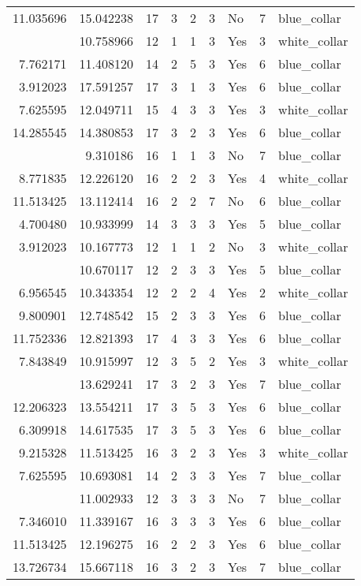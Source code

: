\documentclass[
]{article}
\begin{document}
\begin{longtable}[t]{rrrrrllrl}
11.035696 & 15.042238 & 17 & 3 & 2 & 3 & No & 7 & blue\_collar\\
\addlinespace
3.912023 & 10.758966 & 12 & 1 & 1 & 3 & Yes & 3 & white\_collar\\
7.762171 & 11.408120 & 14 & 2 & 5 & 3 & Yes & 6 & blue\_collar\\
3.912023 & 17.591257 & 17 & 3 & 1 & 3 & Yes & 6 & blue\_collar\\
7.625595 & 12.049711 & 15 & 4 & 3 & 3 & Yes & 3 & white\_collar\\
14.285545 & 14.380853 & 17 & 3 & 2 & 3 & Yes & 6 & blue\_collar\\
\addlinespace
3.912023 & 9.310186 & 16 & 1 & 1 & 3 & No & 7 & blue\_collar\\
8.771835 & 12.226120 & 16 & 2 & 2 & 3 & Yes & 4 & white\_collar\\
11.513425 & 13.112414 & 16 & 2 & 2 & 7 & No & 6 & blue\_collar\\
4.700480 & 10.933999 & 14 & 3 & 3 & 3 & Yes & 5 & blue\_collar\\
3.912023 & 10.167773 & 12 & 1 & 1 & 2 & No & 3 & white\_collar\\
\addlinespace
5.247024 & 10.670117 & 12 & 2 & 3 & 3 & Yes & 5 & blue\_collar\\
6.956545 & 10.343354 & 12 & 2 & 2 & 4 & Yes & 2 & white\_collar\\
9.800901 & 12.748542 & 15 & 2 & 3 & 3 & Yes & 6 & blue\_collar\\
11.752336 & 12.821393 & 17 & 4 & 3 & 3 & Yes & 6 & blue\_collar\\
7.843849 & 10.915997 & 12 & 3 & 5 & 2 & Yes & 3 & white\_collar\\
\addlinespace
11.513425 & 13.629241 & 17 & 3 & 2 & 3 & Yes & 7 & blue\_collar\\
12.206323 & 13.554211 & 17 & 3 & 5 & 3 & Yes & 6 & blue\_collar\\
6.309918 & 14.617535 & 17 & 3 & 5 & 3 & Yes & 6 & blue\_collar\\
9.215328 & 11.513425 & 16 & 3 & 2 & 3 & Yes & 3 & white\_collar\\
7.625595 & 10.693081 & 14 & 2 & 3 & 3 & Yes & 7 & blue\_collar\\
\addlinespace
7.843849 & 11.002933 & 12 & 3 & 3 & 3 & No & 7 & blue\_collar\\
7.346010 & 11.339167 & 16 & 3 & 3 & 3 & Yes & 6 & blue\_collar\\
11.513425 & 12.196275 & 16 & 2 & 2 & 3 & Yes & 6 & blue\_collar\\
13.726734 & 15.667118 & 16 & 3 & 2 & 3 & Yes & 7 & blue\_collar\\

\end{longtable}
\end{document}
